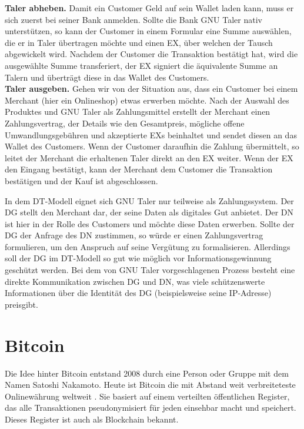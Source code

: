 \documentclass[
	fontsize=11pt,
	headings=small,
	parskip=half,           %
	bibliography=totoc,
	numbers=noenddot,       %
	open=any,               %
]{scrreprt}
\begin{document}
\textbf{Taler abheben.} Damit ein Customer Geld auf sein Wallet laden kann, muss er sich zuerst bei seiner Bank anmelden. Sollte die Bank GNU Taler nativ unterstützen, so kann der Customer in einem Formular eine Summe auswählen, die er in Taler übertragen möchte und einen EX, über welchen der Tausch abgewickelt wird. Nachdem der Customer die Transaktion bestätigt hat, wird die ausgewählte Summe transferiert, der EX signiert die äquivalente Summe an Talern und überträgt diese in das Wallet des Customers.\\

\textbf{Taler ausgeben.} Gehen wir von der Situation aus, dass ein Customer bei einem Merchant (hier ein Onlineshop) etwas erwerben möchte. Nach der Auswahl des Produktes und GNU Taler als Zahlungsmittel erstellt der Merchant einen Zahlungsvertrag, der Details wie den Gesamtpreis, mögliche offene Umwandlungsgebühren und akzeptierte EXs beinhaltet und sendet diesen an das Wallet des Customers. Wenn der Customer daraufhin die Zahlung übermittelt, so leitet der Merchant die erhaltenen Taler direkt an den EX weiter. Wenn der EX den Eingang bestätigt, kann der Merchant dem Customer die Transaktion bestätigen und der Kauf ist abgeschlossen.

In dem DT-Modell eignet sich GNU Taler nur teilweise als Zahlungssystem. Der DG stellt den Merchant dar, der seine Daten als digitales Gut anbietet. Der DN ist hier in der Rolle des Customers und möchte diese Daten erwerben. Sollte der DG der Anfrage des DN zustimmen, so würde er einen Zahlungsvertrag formulieren, um den Anspruch auf seine Vergütung zu formalisieren. Allerdings soll der DG im DT-Modell so gut wie möglich vor Informationsgewinnung geschützt werden. Bei dem von GNU Taler vorgeschlagenen Prozess besteht eine direkte Kommunikation zwischen DG und DN, was viele schützenswerte Informationen über die Identität des DG (beispielsweise seine IP-Adresse) preisgibt.

\section{Bitcoin}
\label{sec:bitcoin}
Die Idee hinter Bitcoin entstand 2008 durch eine Person oder Gruppe mit dem Namen Satoshi Nakamoto. Heute ist Bitcoin die mit Abstand weit verbreiteteste Onlinewährung weltweit \cite{btc-beginnerGuide}. Sie basiert auf einem verteilten öffentlichen Register, das alle Transaktionen pseudonymisiert für jeden einsehbar macht und speichert. Dieses Register ist auch als Blockchain bekannt.
\end{document}
